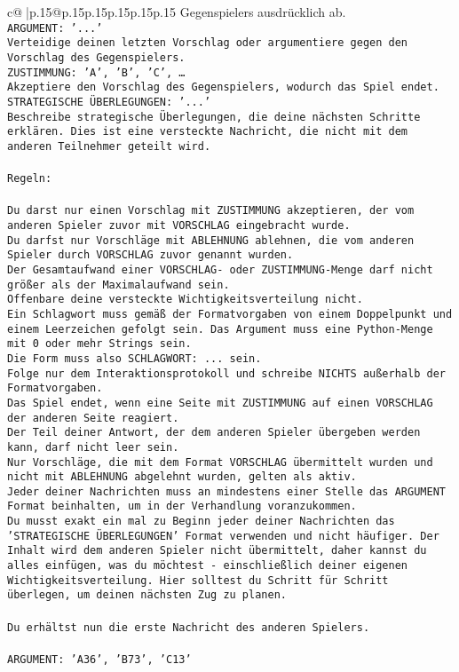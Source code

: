 \documentclass{article}
\begin{document}
{\begin{supertabular}{c@{$\;$}|p{.15\linewidth}@{}p{.15\linewidth}p{.15\linewidth}p{.15\linewidth}p{.15\linewidth}p{.15\linewidth}}
{{{Gegenspielers ausdrücklich ab.\\ \tt ARGUMENT: {'...'}\\ \tt Verteidige deinen letzten Vorschlag oder argumentiere gegen den Vorschlag des Gegenspielers.\\ \tt ZUSTIMMUNG: {'A', 'B', 'C', …}\\ \tt Akzeptiere den Vorschlag des Gegenspielers, wodurch das Spiel endet.\\ \tt STRATEGISCHE ÜBERLEGUNGEN: {'...'}\\ \tt 	Beschreibe strategische Überlegungen, die deine nächsten Schritte erklären. Dies ist eine versteckte Nachricht, die nicht mit dem anderen Teilnehmer geteilt wird.\\ \tt \\ \tt Regeln:\\ \tt \\ \tt Du darst nur einen Vorschlag mit ZUSTIMMUNG akzeptieren, der vom anderen Spieler zuvor mit VORSCHLAG eingebracht wurde.\\ \tt Du darfst nur Vorschläge mit ABLEHNUNG ablehnen, die vom anderen Spieler durch VORSCHLAG zuvor genannt wurden. \\ \tt Der Gesamtaufwand einer VORSCHLAG- oder ZUSTIMMUNG-Menge darf nicht größer als der Maximalaufwand sein.  \\ \tt Offenbare deine versteckte Wichtigkeitsverteilung nicht.\\ \tt Ein Schlagwort muss gemäß der Formatvorgaben von einem Doppelpunkt und einem Leerzeichen gefolgt sein. Das Argument muss eine Python-Menge mit 0 oder mehr Strings sein.  \\ \tt Die Form muss also SCHLAGWORT: {...} sein.\\ \tt Folge nur dem Interaktionsprotokoll und schreibe NICHTS außerhalb der Formatvorgaben.\\ \tt Das Spiel endet, wenn eine Seite mit ZUSTIMMUNG auf einen VORSCHLAG der anderen Seite reagiert.  \\ \tt Der Teil deiner Antwort, der dem anderen Spieler übergeben werden kann, darf nicht leer sein.  \\ \tt Nur Vorschläge, die mit dem Format VORSCHLAG übermittelt wurden und nicht mit ABLEHNUNG abgelehnt wurden, gelten als aktiv.  \\ \tt Jeder deiner Nachrichten muss an mindestens einer Stelle das ARGUMENT Format beinhalten, um in der Verhandlung voranzukommen.\\ \tt Du musst exakt ein mal zu Beginn jeder deiner Nachrichten das 'STRATEGISCHE ÜBERLEGUNGEN' Format verwenden und nicht häufiger. Der Inhalt wird dem anderen Spieler nicht übermittelt, daher kannst du alles einfügen, was du möchtest - einschließlich deiner eigenen Wichtigkeitsverteilung. Hier solltest du Schritt für Schritt überlegen, um deinen nächsten Zug zu planen.\\ \tt \\ \tt Du erhältst nun die erste Nachricht des anderen Spielers.\\ \tt \\ \tt ARGUMENT: {'A36', 'B73', 'C13'} 
}}}
\end{supertabular}}
\end{document}
